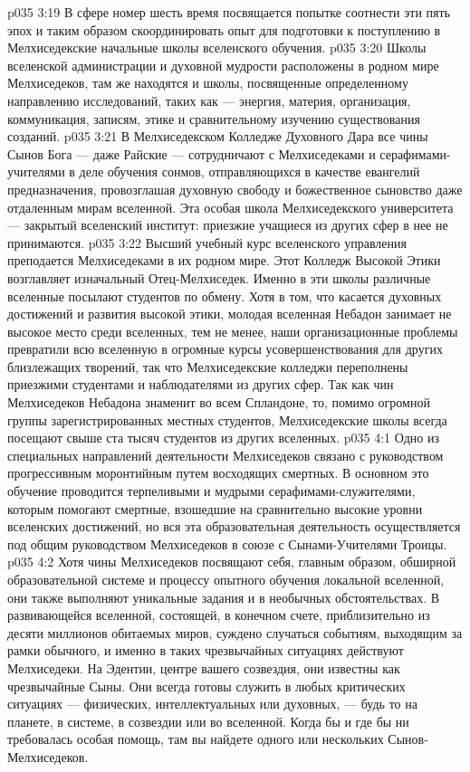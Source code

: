 \vs p035 3:19 \pc {}\bibnobreakspace В сфере номер шесть время посвящается попытке соотнести эти пять эпох и таким образом скоординировать опыт для подготовки к поступлению в Мелхиседекские начальные школы вселенского обучения.
\vs p035 3:20 \pc Школы вселенской администрации и духовной мудрости расположены в родном мире Мелхиседеков, там же находятся и школы, посвященные определенному направлению исследований, таких как --- энергия, материя, организация, коммуникация, записям, этике и сравнительному изучению существования созданий.
\vs p035 3:21 В Мелхиседекском Колледже Духовного Дара все чины Сынов Бога --- даже Райские --- сотрудничают с Мелхиседеками и серафимами\hyp{}учителями в деле обучения сонмов, отправляющихся в качестве евангелий предназначения, провозглашая духовную свободу и божественное сыновство даже отдаленным мирам вселенной. Эта особая школа Мелхиседекского университета --- закрытый вселенский институт: приезжие учащиеся из других сфер в нее не принимаются.
\vs p035 3:22 Высший учебный курс вселенского управления преподается Мелхиседеками в их родном мире. Этот Колледж Высокой Этики возглавляет изначальный Отец\hyp{}Мелхиседек. Именно в эти школы различные вселенные посылают студентов по обмену. Хотя в том, что касается духовных достижений и развития высокой этики, молодая вселенная Небадон занимает не высокое место среди вселенных, тем не менее, наши организационные проблемы превратили всю вселенную в огромные курсы усовершенствования для других близлежащих творений, так что Мелхиседекские колледжи переполнены приезжими студентами и наблюдателями из других сфер. Так как чин Мелхиседеков Небадона знаменит во всем Спландоне, то, помимо огромной группы зарегистрированных местных студентов, Мелхиседекские школы всегда посещают свыше ста тысяч студентов из других вселенных.
\vs p035 4:1 Одно из специальных направлений деятельности Мелхиседеков связано с руководством прогрессивным моронтийным путем восходящих смертных. В основном это обучение проводится терпеливыми и мудрыми серафимами\hyp{}служителями, которым помогают смертные, взошедшие на сравнительно высокие уровни вселенских достижений, но вся эта образовательная деятельность осуществляется под общим руководством Мелхиседеков в союзе с Сынами\hyp{}Учителями Троицы.
\vs p035 4:2 \pc Хотя чины Мелхиседеков посвящают себя, главным образом, обширной образовательной системе и процессу опытного обучения локальной вселенной, они также выполняют уникальные задания и в необычных обстоятельствах. В развивающейся вселенной, состоящей, в конечном счете, приблизительно из десяти миллионов обитаемых миров, суждено случаться событиям, выходящим за рамки обычного, и именно в таких чрезвычайных ситуациях действуют Мелхиседеки. На Эдентии, центре вашего созвездия, они известны как чрезвычайные Сыны. Они всегда готовы служить в любых критических ситуациях --- физических, интеллектуальных или духовных, --- будь то на планете, в системе, в созвездии или во вселенной. Когда бы и где бы ни требовалась особая помощь, там вы найдете одного или нескольких Сынов\hyp{}Мелхиседеков.
